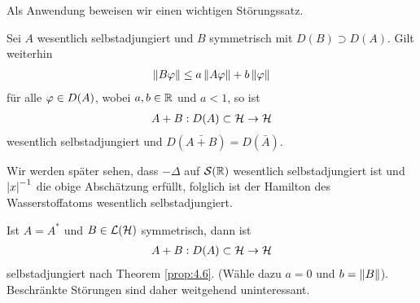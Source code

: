 Als Anwendung beweisen wir einen wichtigen Störungssatz.

\begin{thm}
\label{prop:4.6}
Sei $A$ wesentlich selbstadjungiert und $B$ symmetrisch mit $D(B)\supset D(A)$.
Gilt weiterhin
\begin{align*}
\left\|B\varphi\right\| \le a\left\|A\varphi\right\| + b\left\|\varphi\right\|
\end{align*}
für alle $\varphi\in D(A)$, wobei $a,b\in\mathbb{R}$ und $a<1$, so ist
\begin{align*}
A+B : D(A)\subset \mathcal{H}\to \mathcal{H}
\end{align*}
wesentlich selbstadjungiert und $D(\bar{A+B}) = D(\bar{A})$.\fishhere
\end{thm}

Wir werden später sehen, dass $-\Delta$ auf $\mathcal{S}(\mathbb{R})$ wesentlich
selbstadjungiert ist und $\left|x\right|^{-1}$ die obige Abschätzung erfüllt, folglich
ist der Hamilton des Wasserstoffatoms wesentlich selbstadjungiert.

\begin{bem*}
Ist $A=A^*$ und $B\in\mathcal{L}(\mathcal{H})$ symmetrisch, dann ist
\begin{align*}
A+B : D(A)\subset\mathcal{H} \to \mathcal{H} 
\end{align*}
selbstadjungiert nach Theorem \ref{prop:4.6}. (Wähle dazu $a=0$ und
$b=\left\|B\right\|$). Beschränkte Störungen sind daher weitgehend
uninteressant.\maphere
\end{bem*}

